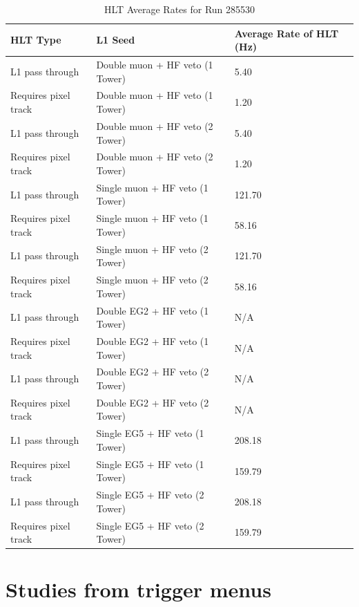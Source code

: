 \begin{table}[h!]
\centering
\caption{HLT Average Rates for Run 285530}
\label{table:trigHLTUPC2016}
\begin{tabular}{@{}lll@{}}
\toprule
HLT Type             & L1 Seed                           & Average Rate of HLT (Hz) \\ \midrule
L1 pass through      & Double muon + HF veto (1 Tower) & 5.40	                    \\
Requires pixel track & Double muon + HF veto (1 Tower) & 1.20	                    \\
L1 pass through      & Double muon + HF veto (2 Tower) & 5.40                     	\\
Requires pixel track & Double muon + HF veto (2 Tower) & 1.20                     	\\
L1 pass through      & Single muon + HF veto (1 Tower) & 121.70                   	\\
Requires pixel track & Single muon + HF veto (1 Tower) & 58.16                    	\\
L1 pass through      & Single muon + HF veto (2 Tower) & 121.70	                    \\
Requires pixel track & Single muon + HF veto (2 Tower) & 58.16                    	\\
L1 pass through      & Double EG2 + HF veto (1 Tower)  & N/A                     	\\
Requires pixel track & Double EG2 + HF veto (1 Tower)  & N/A                     	\\
L1 pass through      & Double EG2 + HF veto (2 Tower)  & N/A                  		\\
Requires pixel track & Double EG2 + HF veto (2 Tower)  & N/A                     	\\ 
L1 pass through      & Single EG5 + HF veto (1 Tower)  & 208.18          			\\
Requires pixel track & Single EG5 + HF veto (1 Tower)  & 159.79                     \\
L1 pass through      & Single EG5 + HF veto (2 Tower)  & 208.18                     \\
Requires pixel track & Single EG5 + HF veto (2 Tower)  & 159.79	                    \\ \bottomrule
\end{tabular}
\end{table}

\section{Studies from trigger menus}

